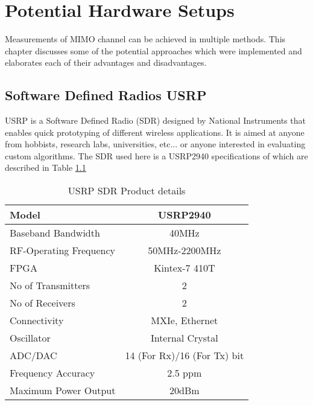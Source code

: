 \chapter{Potential Hardware Setups}
\label{ch:PotenHWSetup}

Measurements of MIMO channel can be achieved in multiple methods. This chapter discusses some of the potential approaches which were implemented and elaborates each of their advantages and disadvantages.

\section{Software Defined Radios USRP}\label{sec:USRP}

USRP is a Software Defined Radio (SDR) designed by National Instruments that enables quick prototyping of different wireless applications. It is aimed at anyone from hobbists, research labs, universities, etc... or anyone interested in evaluating custom algorithms. The SDR used here is a USRP2940 specifications of which are described in Table \ref{tb:USRP}

\begin{table}[H]
    \begin{center}
        \begin{tabular}{|l|c|}
        \hline
            Model                   & USRP2940          \\ \hline
            Baseband Bandwidth      & 40MHz             \\ \hline
            RF-Operating Frequency  & 50MHz-2200MHz     \\ \hline
            FPGA                    & Kintex-7 410T     \\ \hline
            No of Transmitters      & 2                 \\ \hline
            No of Receivers         & 2                 \\ \hline
            Connectivity            & MXIe, Ethernet    \\ \hline
            Oscillator              & Internal Crystal  \\ \hline
            ADC/DAC                 & 14 (For Rx)/16 (For Tx) bit         \\ \hline
            Frequency Accuracy      & 2.5 ppm           \\ \hline
            Maximum Power Output    & 20dBm             \\ \hline
        \end{tabular}
    \end{center}
    \caption{USRP SDR Product details}
    \label{tb:USRP}
\end{table}

